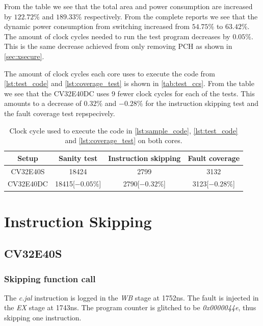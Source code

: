 From the table we see that the total area and power consumption are increased by $122.72\%$ and $189.33\%$ respectively. From the complete reports we see that the dynamic power consumption from switching increased from $54.75\%$ to $63.42\%$. The amount of clock cycles needed to run the test program decreases by $0.05\%$. This is the same decrease achieved from only removing PCH as shown in \autoref{sec:xsecure}.

The amount of clock cycles each core uses to execute the code from \autoref{lst:test_code} and \autoref{lst:coverage_test} is shown in \autoref{tab:test_ccs}. From the table we see that the CV32E40DC uses 9 fewer clock cycles for each of the tests. This amounts to a decrease of $0.32\%$ and $-0.28\%$ for the instruction skipping test and the fault coverage test repspecively. 

\begin{table}[h]
\centering
\caption{Clock cycle used to execute the code in \autoref{lst:sample_code}, \autoref{lst:test_code} and \autoref{lst:coverage_test} on both cores.}
\label{tab:test_ccs}
\begin{tabular}{c|ccc}
\toprule 
Setup & Sanity test & Instruction skipping & Fault coverage \\
\midrule
\rowcolor{black!20} CV32E40S & 18424 & 2799 & 3132\\
CV32E40DC & 18415[$-0.05\%$] & 2790[$-0.32\%$] & 3123[$-0.28\%$]\\
\bottomrule
\end{tabular}
\end{table}

\section{Instruction Skipping}
\label{sec:instr_skip_result}

\subsection{CV32E40S}
\label{subsec:single_instr_skip}

\subsubsection{Skipping function call}
\label{subsubsec:func_call}

The \textit{c.jal} instruction is logged in the \textit{WB} stage at 1752ns. The fault is injected in the \textit{EX} stage at 1743ns. The program counter is glitched to be \textit{0x0000044e}, thus skipping one instruction. 

